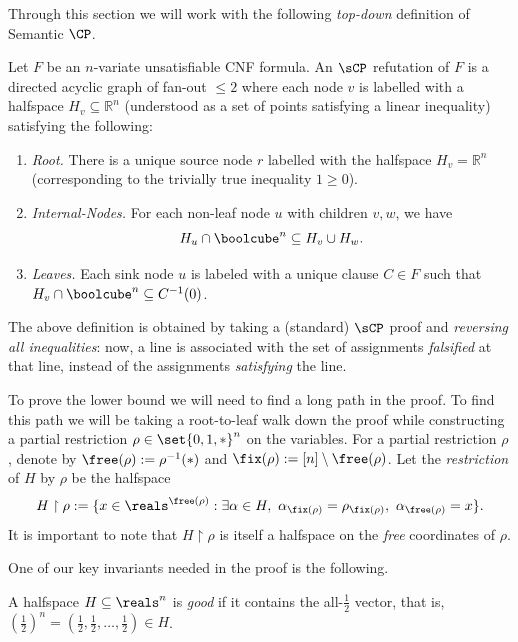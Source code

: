 \documentclass{toc}
\begin{document}
Through this section we will work with the following \emph{top-down} definition of Semantic $\CP$.
\begin{definition}
	Let $F$ be an $n$-variate unsatisfiable CNF formula.
	An $\sCP$ refutation of $F$ is a directed acyclic graph of fan-out $\leq 2$ where each node $v$ is labelled with a halfspace $H_v\subseteq \mathbb{R}^n$ (understood as a set of points satisfying a linear inequality) satisfying the following:
	\begin{enumerate}
		\item \emph{Root.} There is a unique source node $r$ labelled with the halfspace $H_v=\mathbb{R}^n$ (corresponding to the trivially true inequality $1 \geq 0$).
		\item \emph{Internal-Nodes.} For each non-leaf node $u$ with children $v, w$, we have \[H_u \cap \boolcube^n \subseteq H_v \cup H_{w}.\]
		\item \emph{Leaves.} Each sink node $u$ is labeled with a unique clause $C \in F$ such that $H_v \cap \boolcube^n \subseteq C^{-1}(0)$.
	\end{enumerate}
\end{definition}
The above definition is obtained by taking a (standard) $\sCP$ proof and \emph{reversing all inequalities}: now, a line is associated with the set of assignments \emph{falsified} at that line, instead of the assignments \emph{satisfying} the line.

To prove the lower bound we will need to find a long path in the proof.
To find this path we will be taking a root-to-leaf walk down the proof while constructing a partial restriction $\rho \in \set{0,1,*}^n$ on the variables. 
For a partial restriction $\rho$, denote by $\free(\rho) := \rho^{-1}(*)$ and $\fix(\rho):= [n] \setminus \free(\rho)$. 
Let the \emph{restriction} of $H$ by $\rho$ be the halfspace
\[H \restriction \rho := \{ x \in \reals^{\free(\rho)}: \exists \alpha \in H,~ \alpha_{\fix(\rho)} = \rho_{\fix(\rho)},~ \alpha_{\free(\rho)} = x \}. \]
It is important to note that $H \restriction \rho$ is itself a halfspace on the \emph{free} coordinates of $\rho$.

One of our key invariants needed in the proof is the following.
\begin{definition}\label{def:good-halfspace}
	A halfspace $H \subseteq \reals^n$ is \emph{good} if it contains the all-$\frac{1}{2}$ vector, that is, $(\frac{1}{2})^n=(\frac{1}{2},\frac{1}{2},\ldots,\frac{1}{2}) \in H$.
\end{definition}
%
%
\end{document}
